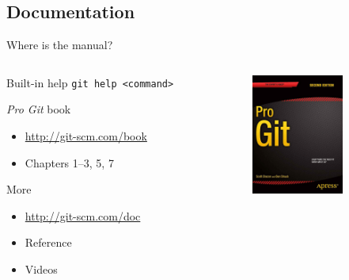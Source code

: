 \documentclass{beamer}
\begin{document}
\subsection{Documentation}

\begin{frame}{Where is the manual?}
  \begin{columns}[t]
    \begin{column}{7cm}
      \begin{block}{Built-in help}
        \texttt{git help <command>}
      \end{block}
      \begin{block}{\emph{Pro Git} book}
        \begin{itemize}
        \item \url{http://git-scm.com/book}
        \item Chapters 1--3, 5, 7
        \end{itemize}
      \end{block}
      \begin{block}{More}
        \begin{itemize}
        \item \url{http://git-scm.com/doc}
        \item Reference
        \item Videos
        \end{itemize}
      \end{block}
    \end{column}
    \begin{column}{3cm}
      \begin{center}
        \includegraphics[width=3cm]{images/progit2.png}
      \end{center}
    \end{column}
  \end{columns}
\end{frame}
\end{document}
